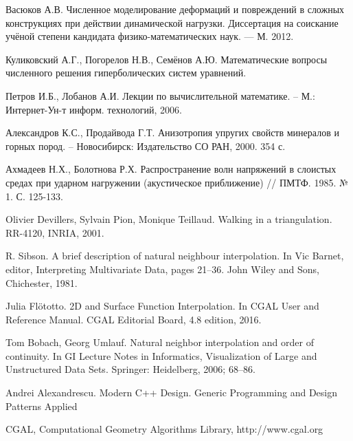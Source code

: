 \begin{thebibliography}{99}
 Васюков А.В. Численное моделирование деформаций и повреждений в сложных конструкциях при действии динамической нагрузки. Диссертация на соискание учёной степени кандидата физико-математических наук. — М. 2012.

\normalsize
{} Куликовский А.Г., Погорелов Н.В., Семёнов А.Ю. Математические вопросы численного решения гиперболических систем уравнений.

 Петров И.Б., Лобанов А.И. Лекции по вычислительной математике. – М.: Интернет-Ун-т информ. технологий, 2006.

 Александров К.С., Продайвода Г.Т. Анизотропия упругих свойств минералов и горных пород. – Новосибирск: Издательство СО РАН, 2000. 354 с.

 Ахмадеев Н.Х., Болотнова Р.Х. Распространение волн напряжений в слоистых средах при ударном нагружении (акустическое приближение) // ПМТФ. 1985. № 1. С. 125-133.

 Olivier Devillers, Sylvain Pion, Monique Teillaud. Walking in a triangulation. RR-4120, INRIA, 2001.

 R. Sibson. A brief description of natural neighbour interpolation. In Vic Barnet, editor, Interpreting Multivariate Data, pages 21–36. John Wiley and Sons, Chichester, 1981.

 Julia Flötotto. 2D and Surface Function Interpolation. In CGAL User and Reference Manual. CGAL Editorial Board, 4.8 edition, 2016.

 Tom Bobach, Georg Umlauf. Natural neighbor interpolation and order of continuity. In GI Lecture Notes in Informatics, Visualization of Large and Unstructured Data Sets. Springer: Heidelberg, 2006; 68–86.

 Andrei Alexandrescu. Modern C++ Design. Generic Programming and Design Patterns Applied

 CGAL, Computational Geometry Algorithms Library, http://www.cgal.org

\end{thebibliography}
